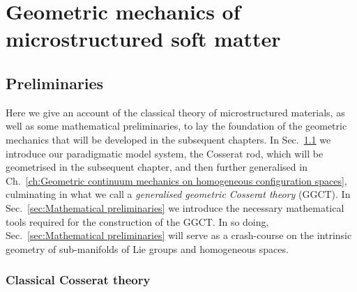 
\part{Geometric mechanics of microstructured soft matter} \label{part:Geometric mechanics of microstructured soft matter}



\chapter{Preliminaries} \label{sec:geometry introduction}

Here we give an account of the classical theory of microstructured materials, as well as some mathematical preliminaries, to lay the foundation of the geometric mechanics that will be developed in the subsequent chapters. In Sec.~\ref{sec:Classical Cosserat theory} we introduce our paradigmatic model system, the Cosserat rod, which will be geometrised in the subsequent chapter, and then further generalised in Ch.~\ref{ch:Geometric continuum mechanics on homogeneous configuration spaces}, culminating in what we call a \textit{generalised geometric Cosserat theory} (GGCT). In Sec.~\ref{sec:Mathematical preliminaries} we introduce the necessary mathematical tools required for the construction of the GGCT. In so doing, Sec.~\ref{sec:Mathematical preliminaries} will serve as a crash-course on the intrinsic geometry of sub-manifolds of Lie groups and homogeneous spaces.

\section{Classical Cosserat theory} \label{sec:Classical Cosserat theory}

